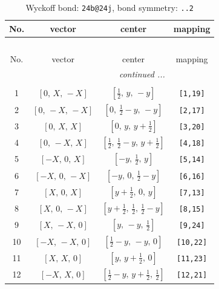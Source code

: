 \documentclass[fleqn,8pt]{jsarticle}
\begin{document}
\begin{longtable}{cccc}
\caption{Wyckoff bond: {\tt 24b@24j}, bond symmetry: {\tt ..2}}
 \\
 \hline \hline
No. & vector & center & mapping \\ \hline \endfirsthead

\multicolumn{3}{l}{\tablename\ \thetable{}} \\
 \hline \hline
No. & vector & center & mapping \\ \hline \endhead

 \hline \hline
\multicolumn{3}{r}{\footnotesize\it continued ...} \\ \endfoot

 \hline \hline
\multicolumn{3}{r}{} \\ \endlastfoot

1 & $\left[ 0,\, X,\, - X \right]$ & $\left[ \frac{1}{2},\, y,\, - y \right]$ & {\tt [1,19]} \\ \hline
2 & $\left[ 0,\, - X,\, - X \right]$ & $\left[ 0,\, \frac{1}{2} - y,\, - y \right]$ & {\tt [2,17]} \\ \hline
3 & $\left[ 0,\, X,\, X \right]$ & $\left[ 0,\, y,\, y + \frac{1}{2} \right]$ & {\tt [3,20]} \\ \hline
4 & $\left[ 0,\, - X,\, X \right]$ & $\left[ \frac{1}{2},\, \frac{1}{2} - y,\, y + \frac{1}{2} \right]$ & {\tt [4,18]} \\ \hline
5 & $\left[ - X,\, 0,\, X \right]$ & $\left[ - y,\, \frac{1}{2},\, y \right]$ & {\tt [5,14]} \\ \hline
6 & $\left[ - X,\, 0,\, - X \right]$ & $\left[ - y,\, 0,\, \frac{1}{2} - y \right]$ & {\tt [6,16]} \\ \hline
7 & $\left[ X,\, 0,\, X \right]$ & $\left[ y + \frac{1}{2},\, 0,\, y \right]$ & {\tt [7,13]} \\ \hline
8 & $\left[ X,\, 0,\, - X \right]$ & $\left[ y + \frac{1}{2},\, \frac{1}{2},\, \frac{1}{2} - y \right]$ & {\tt [8,15]} \\ \hline
9 & $\left[ X,\, - X,\, 0 \right]$ & $\left[ y,\, - y,\, \frac{1}{2} \right]$ & {\tt [9,24]} \\ \hline
10 & $\left[ - X,\, - X,\, 0 \right]$ & $\left[ \frac{1}{2} - y,\, - y,\, 0 \right]$ & {\tt [10,22]} \\ \hline
11 & $\left[ X,\, X,\, 0 \right]$ & $\left[ y,\, y + \frac{1}{2},\, 0 \right]$ & {\tt [11,23]} \\ \hline
12 & $\left[ - X,\, X,\, 0 \right]$ & $\left[ \frac{1}{2} - y,\, y + \frac{1}{2},\, \frac{1}{2} \right]$ & {\tt [12,21]} \\ \hline

\end{longtable}
\end{document}
